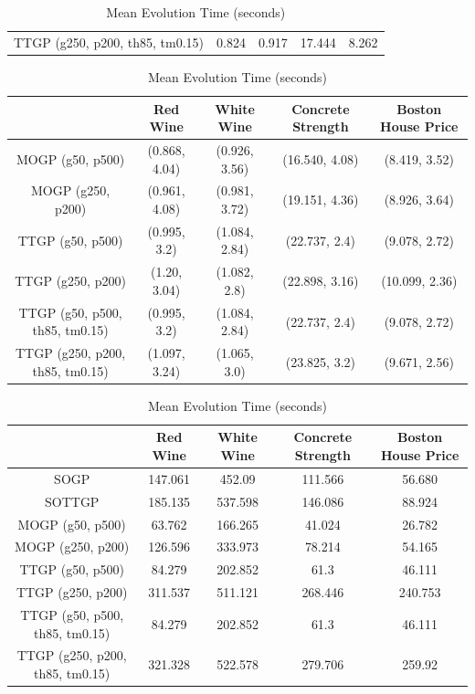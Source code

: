 \documentclass[a4paper, twocolumn]{article}
\begin{document}
\begin{table}[!htb]
\begin{center}
\begin{tabular}{ c|cccc }
			TTGP (g250, p200, th85, tm0.15) &0.824&0.917&17.444&8.262\\
		\end{tabular}
	\end{center}
	\begin{center}
		\caption{Mean Balanced Solution at 50th generation (RMSE, tree size)}
		\label{table:3}
		\begin{tabular}{ c|cccc }
			& Red Wine & White Wine & Concrete Strength & Boston House Price\\
			\hline
			MOGP (g50, p500) &(0.868, 4.04)&(0.926, 3.56)&(16.540, 4.08)&(8.419, 3.52)\\
			MOGP (g250, p200) &(0.961, 4.08)&(0.981, 3.72)&(19.151, 4.36)&(8.926, 3.64)\\
			TTGP (g50, p500) &(0.995, 3.2)&(1.084, 2.84)&(22.737, 2.4)&(9.078, 2.72)\\
			TTGP (g250, p200) &(1.20, 3.04)&(1.082, 2.8)&(22.898, 3.16)&(10.099, 2.36)\\
			TTGP (g50, p500, th85, tm0.15) &(0.995, 3.2)&(1.084, 2.84)&(22.737, 2.4)&(9.078, 2.72)\\
			TTGP (g250, p200, th85, tm0.15) &(1.097, 3.24)&(1.065, 3.0)&(23.825, 3.2)&(9.671, 2.56)\\
		\end{tabular}
	\end{center}
	\begin{center}
		\caption{Mean Evolution Time (seconds)}
		\label{table:4}
		\begin{tabular}{ c|cccc }
			& Red Wine & White Wine & Concrete Strength & Boston House Price\\
			\hline
			SOGP &147.061&452.09&111.566&56.680\\
			SOTTGP &185.135&537.598&146.086&88.924\\
			MOGP (g50, p500) &63.762&166.265&41.024&26.782\\
			MOGP (g250, p200) &126.596&333.973&78.214&54.165\\
			TTGP (g50, p500) &84.279&202.852&61.3&46.111\\
			TTGP (g250, p200) &311.537&511.121&268.446&240.753\\
			TTGP (g50, p500, th85, tm0.15) &84.279&202.852&61.3&46.111\\
			TTGP (g250, p200, th85, tm0.15) &321.328&522.578&279.706&259.92\\
		\end{tabular}
	\end{center}
\end{table}
\end{document}
